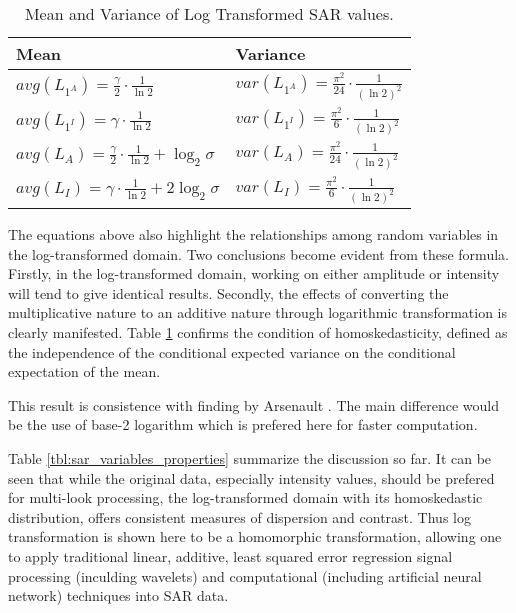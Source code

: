 \documentclass[journal]{IEEEtran}
\begin{document}
\begin{table}[!h]
\caption{ Mean and Variance of Log Transformed SAR values. }
\label{tbl:sar_log_domain_avg_var}
\normalsize
\centering

\begin{tabular}{|l|l|}
\hline
Mean & Variance \\
\hline
$avg(L_{1^A}) = \frac{ \gamma }{2} \cdot \frac{1}{\ln2}$ & $var(L_{1^A}) = \frac{ \pi ^2}{24} \cdot \frac{1}{(\ln2)^2}$ \\
$avg(L_{1^I}) = \gamma \cdot \frac{1}{\ln2} $ & $var(L_{1^I}) = \frac{ \pi ^2}{6} \cdot \frac{1}{(\ln2)^2} $ \\
$avg(L_A) = \frac{ \gamma }{2} \cdot \frac{1}{\ln2} + \log_2{\sigma}$ & $var(L_A) = \frac{ \pi ^2}{24} \cdot \frac{1}{(\ln2)^2}$ \\
$avg(L_I) = \gamma \cdot \frac{1}{\ln2} + 2 \log_2{\sigma}  $ & $ var(L_I) = \frac{ \pi ^2}{6} \cdot \frac{1}{(\ln2)^2}$ \\
\hline
\end{tabular}

\end{table}

The equations above also highlight the relationships among random variables in the log-transformed domain. 
Two conclusions become evident from these formula. 
Firstly, in the log-transformed domain, working on either amplitude or intensity will tend to give identical results. 
Secondly, the effects of converting the multiplicative nature to an additive nature through logarithmic transformation is clearly manifested. 
Table \ref{tbl:sar_log_domain_avg_var} confirms the condition of homoskedasticity,  defined as the independence of the conditional expected variance on the conditional expectation of the mean. 

This result is consistence with finding by Arsenault \cite{Arsenault_JOptSocAm_1976}.  
The main difference would be the use of base-2 logarithm which is prefered here for faster computation. 

Table \ref{tbl:sar_variables_properties} summarize the discussion so far. 
It can be seen that while the original data, especially intensity values, should be prefered for multi-look processing, the log-transformed domain with its homoskedastic distribution, offers consistent measures of dispersion and contrast. 
Thus log transformation is shown here to be a homomorphic transformation, allowing one to apply traditional linear, additive, least squared error regression signal processing (inculding wavelets) and computational (including artificial neural network) techniques into SAR data.
\end{document}

